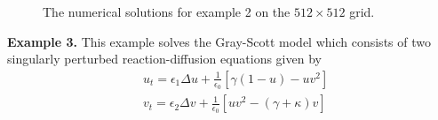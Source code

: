 \begin{figure}[htb]
    \centering
    \caption{The numerical solutions  for example 2 on the $512 \times 512$ grid.}
    \label{Stokes2D}
\end{figure}

\textbf{Example 3.}
 This example solves the Gray-Scott model which consists of two singularly perturbed reaction-diffusion equations given by
$$
\begin{aligned}
&u_{t}=\epsilon_{1} \Delta u+\frac{1}{\epsilon_{0}}\left[\gamma(1-u)-u v^{2}\right] \\
&v_{t}=\epsilon_{2} \Delta v+\frac{1}{\epsilon_{0}}\left[u v^{2}-(\gamma+\kappa) v\right]
\end{aligned}
$$

